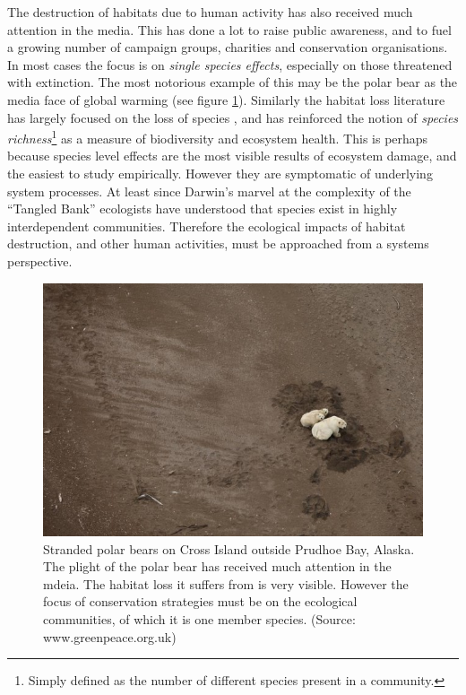 The destruction of habitats due to human activity has also received much attention in the media. This has done a lot to raise public awareness, and to fuel a growing number of campaign groups, charities and conservation organisations. In most cases the focus is on \emph{single species effects}, especially on those threatened with extinction. The most notorious example of this may be the polar bear as the media face of global warming (see figure \ref{fig:polar_bear}). Similarly the habitat loss literature has largely focused on the loss of species \cite{tilman1994habitat, foley2005global}, and has reinforced the notion of \emph{species richness}\footnote{Simply defined as the number of different species present in a community.} as a measure of biodiversity and ecosystem health. This is perhaps because species level effects are the most visible results of ecosystem damage, and the easiest to study empirically. However they are symptomatic of underlying system processes. At least since Darwin's marvel at the complexity of the ``Tangled Bank'' \cite{darwin2009origin} ecologists have understood that species exist in highly interdependent communities. Therefore the ecological impacts of habitat destruction, and other human activities, must be approached from a systems perspective.


\begin{figure}
	\centering
	\includegraphics[width=\textwidth]{"diagrams/polar_bear"}
	\caption{Stranded polar bears on Cross Island outside Prudhoe Bay, Alaska. The plight of the polar bear has received much attention in the mdeia. The habitat loss it suffers from is very visible. However the focus of conservation strategies must be on the ecological communities, of which it is one member species. (Source: www.greenpeace.org.uk)} %
	\label{fig:polar_bear}
\end{figure}

